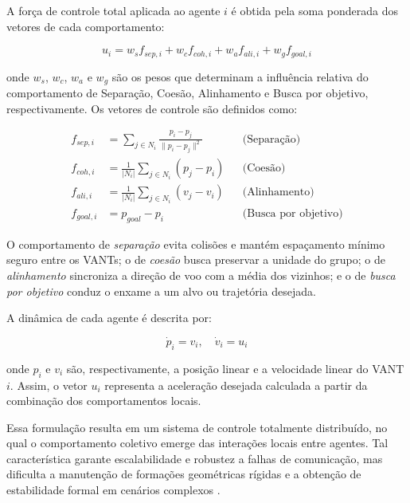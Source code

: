 A força de controle total aplicada ao agente $i$ é obtida pela soma ponderada dos vetores de cada comportamento:

\begin{equation}
u_i = w_s f_{sep,i} + w_c f_{coh,i} + w_a f_{ali,i} + w_g f_{goal,i}
\end{equation}

onde $w_s$, $w_c$, $w_a$ e $w_g$ são os pesos que determinam a influência relativa do comportamento de Separação, Coesão, Alinhamento e Busca por objetivo, respectivamente. Os vetores de controle são definidos como:

\begin{equation}
\begin{aligned}
f_{sep,i} &= \sum_{j \in N_i} \frac{p_i - p_j}{\|p_i - p_j\|^2} && \text{(Separação)} \\[6pt]
f_{coh,i} &= \frac{1}{|N_i|}\sum_{j \in N_i}(p_j - p_i) && \text{(Coesão)} \\[6pt]
f_{ali,i} &= \frac{1}{|N_i|}\sum_{j \in N_i}(v_j - v_i) && \text{(Alinhamento)} \\[6pt]
f_{goal,i} &= p_{goal} - p_i && \text{(Busca por objetivo)}
\end{aligned}
\end{equation}

O comportamento de \textit{separação} evita colisões e mantém espaçamento mínimo seguro entre os VANTs; o de \textit{coesão} busca preservar a unidade do grupo; o de \textit{alinhamento} sincroniza a direção de voo com a média dos vizinhos; e o de \textit{busca por objetivo} conduz o enxame a um alvo ou trajetória desejada.

A dinâmica de cada agente é descrita por:

\begin{equation}
\dot{p}_i = v_i, \quad \dot{v}_i = u_i
\end{equation}

onde $p_i$ e $v_i$ são, respectivamente, a posição linear e a velocidade linear do VANT $i$. Assim, o vetor $u_i$ representa a aceleração desejada calculada a partir da combinação dos comportamentos locais.

Essa formulação resulta em um sistema de controle totalmente distribuído, no qual o comportamento coletivo emerge das interações locais entre agentes. Tal característica garante escalabilidade e robustez a falhas de comunicação, mas dificulta a manutenção de formações geométricas rígidas e a obtenção de estabilidade formal em cenários complexos \citep{bu2024advancement, ouyang2023formation}.

